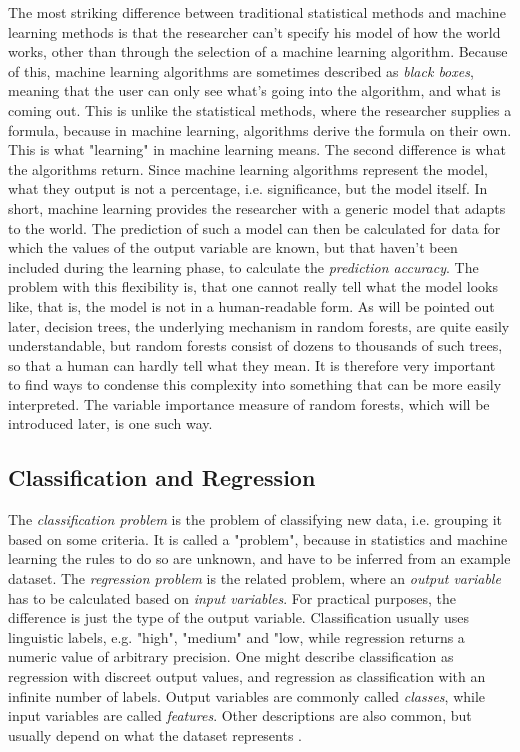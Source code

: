 \documentclass[a4paper,man,12pt,apacite,floatsintext,draftfirst]{apa6} %
\begin{document}
The most striking difference between traditional statistical methods and
machine learning methods is that the researcher can't specify his model of
how the world works, other than through the selection of a machine learning
algorithm.
Because of this, machine learning algorithms are sometimes described as
\emph{black boxes}, meaning that the user can only see what's going into the
algorithm, and what is coming out.
This is unlike the statistical methods, where the researcher supplies a
formula, because in machine learning, algorithms derive the formula on their own.
This is what "learning" in machine learning means.
The second difference is what the algorithms return.
Since machine learning algorithms represent the model, what they output is
not a percentage, i.e. significance, but the model itself.
In short, machine learning provides the researcher with a generic model
that adapts to the world.
The prediction of such a model can then be calculated for data for which
the values of the output variable are known, but that haven't
been included during the learning phase,
to calculate the \emph{prediction accuracy}.
The problem with this flexibility is, that one cannot really tell what the
model looks like, that is, the model is not in a human-readable form.
As will be pointed out later, decision trees, the underlying mechanism in
random forests, are quite easily understandable, but random forests
consist of dozens to thousands of such trees, so that a human can hardly
tell what they mean.
It is therefore very important to find ways to condense this complexity
into something that can be more easily interpreted.
The variable importance measure of random forests, which will be introduced
later, is one such way.

\subsection{Classification and Regression}
The \emph{classification problem} is the problem of classifying new data,
i.e. grouping it based on some criteria.
It is called a "problem", because in statistics and machine learning the
rules to do so are unknown, and have to be inferred from an example dataset.
The \emph{regression problem} is the related problem, where an
\emph{output variable} has to be calculated based on \emph{input variables}.
For practical purposes, the difference is just the type of the output variable.
Classification usually uses linguistic labels, e.g. "high", "medium" and "low,
while regression returns a numeric value of arbitrary precision.
One might describe classification as regression with discreet output values,
and regression as classification with an infinite number of labels.
Output variables are commonly called \emph{classes}, while input variables
are called \emph{features}.
Other descriptions are also common, but usually depend on what the dataset
represents \cite{strobl2009introduction}.
\end{document}

